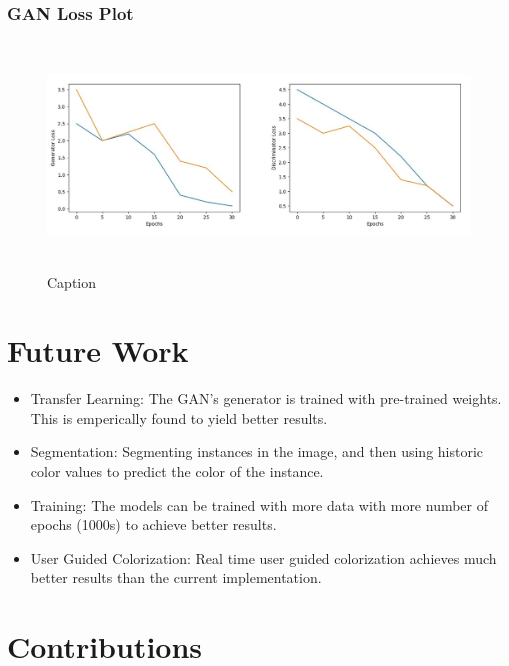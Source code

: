 \documentclass{article}
\begin{document}
\subsubsection{GAN Loss Plot}

\begin{figure}[htbp!]
\begin{center}
    \includegraphics[width=13cm, height=6cm]{gan-loss-plot.png}
    \caption{Caption}
\end{center}
\end{figure}

\section{Future Work}

\begin{itemize}
    \item Transfer Learning: The GAN's generator is trained with pre-trained weights. This is emperically found to yield better results.
    \item Segmentation: Segmenting instances in the image, and then using historic color values to predict the color of the instance. 
    \item Training: The models can be trained with more data with more number of epochs (1000s) to achieve better results.
    \item User Guided Colorization: Real time user guided colorization achieves much better results than the current implementation.
\end{itemize}

\section{Contributions}
\end{document}
